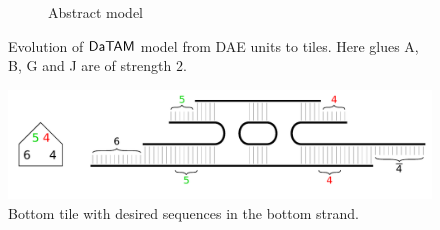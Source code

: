 \begin{figure}[H]
\begin{center}
\begin{subfigure}[b]{0.190\textwidth}
		\caption{Abstract model}
		\label{fig:abstract_model}
	\end{subfigure}
	\caption{Evolution of $\mathsf{DaTAM}$ model from DAE units to tiles. Here glues {\sf A}, {\sf B}, {\sf G} and {\sf J} are of strength $2$.} %
	\label{fig:evolution}
\end{center}
\end{figure}

\begin{figure}[H]
\begin{center}
	\includegraphics[scale=0.75]{./figures/3-color/bottom_tile.pdf}
	\caption{Bottom tile with desired sequences in the bottom strand.}
	\label{fig:bottom_tile}
\end{center}
\end{figure}
